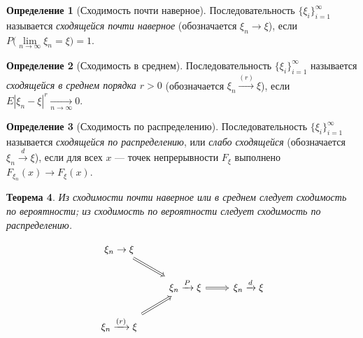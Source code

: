 \documentclass[11pt,openany,a4paper]{scrartcl}
\theoremstyle{plain}
\newtheorem{theorem}{Теорема}[subsection]
\theoremstyle{definition}
\newtheorem{definition}[theorem]{Определение}
\newcommand{\underto}[1]{\xrightarrow[#1]{}}
\newcommand{\overto}[1]{\xrightarrow{#1}}
\begin{document}
\begin{definition}[Сходимость почти наверное]\label{almost_sure_convergence}
    Последовательность $\{\xi_i\}_{i = 1}^\infty$ называется 
    \emph{сходящейся почти наверное} (обозначается $\xi_n \to \xi$), если
    $P\Big(\lim\limits_{n \to \infty} \xi_n = \xi\Big) = 1$.
\end{definition}

\begin{definition}[Сходимость в среднем]\label{convergence_in_mean}
    Последовательность $\{\xi_i\}_{i = 1}^\infty$ называется 
    \emph{сходящейся в среднем порядка $r > 0$}
    (обозначается $\xi_n \overto{(r)} \xi$), если
    $E|\xi_n - \xi|^r \underto{n \to \infty} 0$.
\end{definition}

\begin{definition}[Сходимость по распределению]\label{convergence_in_dostribution}
    Последовательность $\{\xi_i\}_{i = 1}^\infty$ называется 
    \emph{сходящейся по распределению}, или \emph{слабо сходящейся}
    (обозначается $\xi_n \overto{d} \xi$), если
    для всех $x$ — точек непрерывности $F_\xi$ выполнено
    $F_{\xi_n}(x) \to F_\xi (x)$.
\end{definition}

\begin{theorem}
    Из сходимости почти наверное или в среднем следует сходимость по вероятности;
    из сходимость по вероятности следует сходимость по распределению.
\end{theorem}
$$
\begin{tikzcd}
    \xi_n \to \xi \arrow[Rightarrow]{rd} && \\
    & \xi_n \overto{P} \xi \arrow[Rightarrow]{r}  & \xi_n \overto{d} \xi \\
    \xi_n \overto{(r)} \xi \arrow[Rightarrow]{ru} &&
\end{tikzcd}
$$
\end{document}
